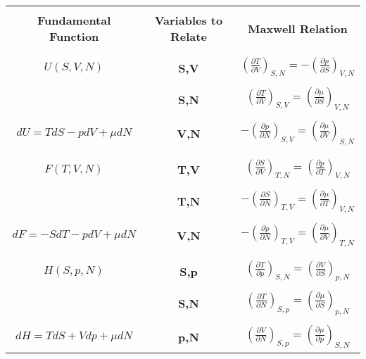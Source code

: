 \documentclass{article}
\begin{document}
\renewcommand{\arraystretch}{1.3}  
\setlength{\tabcolsep}{10pt}       
\setlength{\arrayrulewidth}{0.5pt} 

\begin{tabular}{|>{\Large\bfseries}c|>{\Large\bfseries}c|>{\Large\bfseries}c|}
    \hline
    & & \\
    \LARGE{Fundamental Function} & \LARGE{Variables to Relate} & \LARGE{Maxwell Relation} \\
    & & \\
    \hline
    & & \\
    \normalfont $U(S,V,N)$ & \normalfont S,V & \normalfont $(\frac{\partial T}{\partial V})_{S,N} = -(\frac{\partial p}{\partial S})_{V,N}$ \\
    & & \\
    & \normalfont S,N &  \normalfont $(\frac{\partial T}{\partial V})_{S,V}=(\frac{\partial \mu}{\partial S})_{V,N}$ \\
    & & \\
    $dU=TdS-pdV+ \mu dN$ & \normalfont V,N & \normalfont $-(\frac{\partial p}{\partial N})_{S,V} = (\frac{\partial \mu}{\partial V})_{S,N}$ \\
    & &  \\
    \hline
    & & \\
    \normalfont $F(T,V,N)$ & \normalfont T,V & \normalfont $(\frac{\partial S}{\partial V})_{T,N}= (\frac{\partial p}{\partial T})_{V,N}$ \\
    & & \\
    & \normalfont  T,N & \normalfont $-(\frac{\partial S}{\partial N})_{T,V}= (\frac{\partial \mu }{\partial T})_{V,N} $ \\
    & & \\
    \normalfont $dF=-SdT-pdV+ \mu dN$ & \normalfont V,N & \normalfont $-(\frac{\partial p}{\partial N})_{T,V} = (\frac{\partial \mu }{\partial V})_{T,N} $ \\
    & & \\
    \hline
    & & \\
    \normalfont $H(S,p,N)$ & \normalfont S,p & \normalfont $ (\frac{\partial T}{\partial p})_{S,N}= (\frac{\partial V}{\partial S})_{p,N}$ \\
    & & \\
    & \normalfont S,N & \normalfont $(\frac{\partial T}{\partial N})_{S,p}= (\frac{\partial \mu }{\partial S})_{p,N}$ \\
    & & \\
    \normalfont $dH=TdS+Vdp + \mu dN$ & \normalfont p,N & $(\frac{\partial V}{\partial N})_{S,p}= (\frac{\partial \mu}{\partial p})_{S,N}$ \\

\end{tabular}
\end{document}
